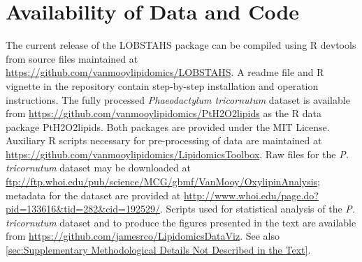 \section{Availability of Data and Code }

The current release of the LOBSTAHS package can be compiled using R devtools from source files maintained at \url{https://github.com/vanmooylipidomics/LOBSTAHS}. A readme file and R vignette in the repository contain step-by-step installation and operation instructions. The fully processed \emph{Phaeodactylum tricornutum} dataset is available from \url{https://github.com/vanmooylipidomics/PtH2O2lipids} as the R data package PtH2O2lipids. Both packages are provided under the MIT License. Auxiliary R scripts necessary for pre-processing of data are maintained at \url{https://github.com/vanmooylipidomics/LipidomicsToolbox}. Raw files for the \emph{P. tricornutum} dataset may be downloaded at \url{ftp://ftp.whoi.edu/pub/science/MCG/gbmf/VanMooy/OxylipinAnalysis}; metadata for the dataset are provided at \url{http://www.whoi.edu/page.do?pid=133616\&tid=282\&cid=192529/}. Scripts used for statistical analysis of the \emph{P. tricornutum} dataset and to produce the figures presented in the text are available from \url{https://github.com/jamesrco/LipidomicsDataViz}. See also \autoref{sec:Supplementary Methodological Details Not Described in the Text}.

